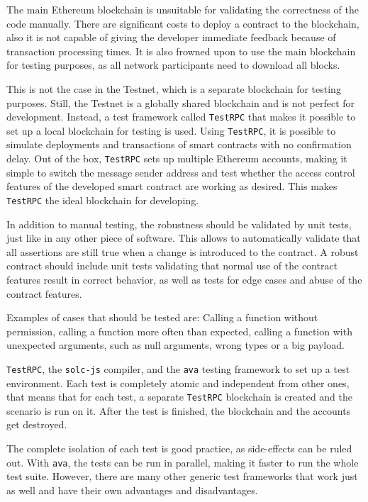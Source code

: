 The main Ethereum blockchain is unsuitable for validating the correctness of the code manually. There are significant costs to deploy a contract to the blockchain, also it is not capable of giving the developer immediate feedback because of transaction processing times. It is also frowned upon to use the main blockchain for testing purposes, as all network participants need to download all blocks.

This is not the case in the Testnet, which is a separate blockchain for testing purposes. Still, the Testnet is a globally shared blockchain and is not perfect for development. Instead, a test framework called \texttt{TestRPC} that makes it possible to set up a local blockchain for testing is used. Using \texttt{TestRPC}, it is possible to simulate deployments and transactions of smart contracts with no confirmation delay. Out of the box, \texttt{TestRPC} sets up multiple Ethereum accounts, making it simple to switch the message sender address and test whether the access control features of the developed smart contract are working as desired. This makes \texttt{TestRPC} the ideal blockchain for developing.

In addition to manual testing, the robustness should be validated by unit tests, just like in any other piece of software. This allows to automatically validate that all assertions are still true when a change is introduced to the contract. A robust contract should include unit tests validating that normal use of the contract features result in correct behavior, as well as tests for edge cases and abuse of the contract features.

Examples of cases that should be tested are: Calling a function without permission, calling a function more often than expected, calling a function with unexpected arguments, such as null arguments, wrong types or a big payload.

\texttt{TestRPC}, the \texttt{solc-js} compiler, and the \texttt{ava} testing framework to set up a test environment. Each test is completely atomic and independent from other ones, that means that for each test, a separate \texttt{TestRPC} blockchain is created and the scenario is run on it. After the test is finished, the blockchain and the accounts get destroyed.

The complete isolation of each test is good practice, as side-effects can be ruled out. With \texttt{ava}, the tests can be run in parallel, making it faster to run the whole test suite. However, there are many other generic test frameworks that work just as well and have their own advantages and disadvantages.

